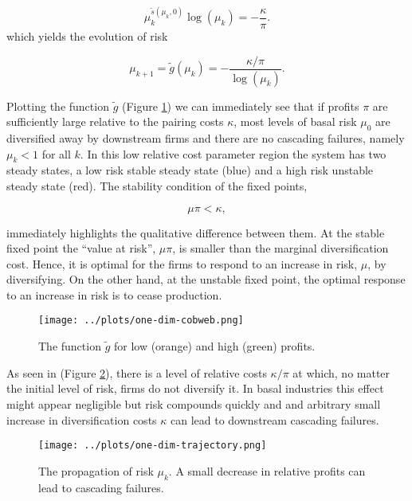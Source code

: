 \documentclass[../../main.tex]{subfiles}
\begin{document}
\begin{equation} \label{eq:one-dimension:foc}
  \mu_k^{\tilde{s}(\mu_k, 0)} \log(\mu_k) = -\frac{\kappa}{\pi}.
\end{equation} which yields the evolution of risk

\begin{equation}
  \mu_{k+1} = \tilde{g}(\mu_k) = -\frac{\kappa / \pi}{\log(\mu_k)}.
\end{equation}

Plotting the function $\tilde{g}$ (Figure \ref{fig:one-dimensional:cobweb}) we can immediately see that if profits $\pi$ are sufficiently large relative to the pairing costs $\kappa$, most levels of basal risk $\mu_0$ are diversified away by downstream firms and there are no cascading failures, namely $\mu_k < 1$ for all $k$. In this low relative cost parameter region the system has two steady states, a low risk stable steady state (blue) and a high risk unstable steady state (red). The stability condition of the fixed points,

\begin{equation}
  \mu \pi < \kappa,
\end{equation}

immediately highlights the qualitative difference between them. At the stable fixed point the ``value at risk'', $\mu \pi$, is smaller than the marginal diversification cost. Hence, it is optimal for the firms to respond to an increase in risk, $\mu$, by diversifying. On the other hand, at the unstable fixed point, the optimal response to an increase in risk is to cease production.

\begin{figure}[H]
  \centering
  \texttt{[image: ../plots/one-dim-cobweb.png]}
  \caption{The function $\tilde{g}$ for low (orange) and high (green) profits.}
  \label{fig:one-dimensional:cobweb}
\end{figure}

As seen in (Figure \ref{fig:one-dimensional:trajectory}), there is a level of relative costs $\kappa / \pi$ at which, no matter the initial level of risk, firms do not diversify it. In basal industries this effect might appear negligible but risk compounds quickly and and arbitrary small increase in diversification costs $\kappa$ can lead to downstream cascading failures. 


\begin{figure}[H]
  \centering
  \texttt{[image: ../plots/one-dim-trajectory.png]}
  \caption{The propagation of risk $\mu_k$. A small decrease in relative profits can lead to cascading failures. }
  \label{fig:one-dimensional:trajectory}
\end{figure}
\end{document}
